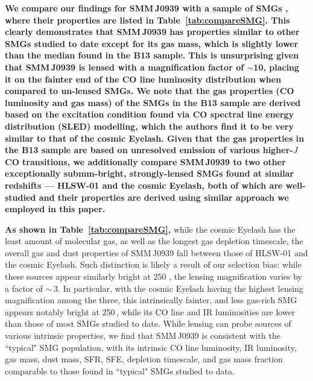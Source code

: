\documentclass[iop, revtex4]{emulateapj}
\begin{document}
{\bf We
compare our findings for SMM\,J0939 
with a sample of SMGs \citep[][hereafter B13]{Bothwell13a}, where their properties are listed in Table~\ref{tab:compareSMG}. This clearly demonstrates that SMM\,J0939 has properties similar
to other SMGs studied to date except for its gas mass, which is slightly lower than the median found in the B13 sample. 
This is unsurprising given that SMM\,J0939 is lensed with a magnification factor of $\sim$10, placing it on the fainter end of the CO line luminosity distribution when compared to un-lensed SMGs. 
We note that the gas properties (CO luminosity and gas mass) of the SMGs in the B13 sample are derived based on the excitation condition found via CO spectral line energy distribution (SLED) modelling, which the authors find it to be very similar to that of the cosmic Eyelash. 
Given that the gas properties in the B13 sample are based on unresolved emission of various higher-$J$ CO transitions, we additionally compare SMM\,J0939 to two other exceptionally submm-bright,
strongly-lensed SMGs
found at similar redshifts --- HLSW-01 and the cosmic Eyelash, both of which are well-studied and their properties are derived using similar approach we employed in this paper.}

{\bf As shown in Table~\ref{tab:compareSMG},} while the cosmic Eyelash has the least amount of molecular gas, as well as
the
longest gas depletion timescale, the overall gas and dust properties of SMM\,J0939 fall between those of HLSW-01 and the
cosmic
Eyelash. Such distinction is likely a result of our selection bias: while these sources appear similarly bright at 250 \micron, the lensing magnification
varies by a factor of $\sim$\,3. In particular, with the cosmic Eyelash having the highest lensing magnification among the
three, this
intrinsically fainter, and less gas-rich SMG appears notably bright
at 250\,\micron, while its CO line and IR luminosities are lower than those of most SMGs studied to date.
While lensing can probe sources
of various intrinsic properties, we find that 
SMM\,J0939 is consistent with the ``typical" SMG population, with its intrinsic CO line luminosity, IR luminosity, gas mass,
dust mass, SFR, SFE, depletion timescale, and gas mass fraction comparable to those found in ``typical" SMGs studied to data.
\end{document}
